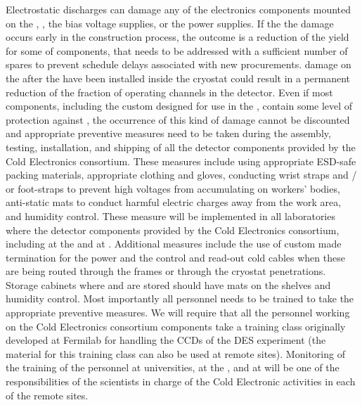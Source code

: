Electrostatic discharges can damage any of the electronics
components mounted on the , ,
the bias voltage supplies, or the power supplies. If the
the damage occurs early in the construction process, 
the outcome is a reduction
of the yield for some of components, that needs to be
addressed with a sufficient number of spares to prevent
schedule delays associated with new procurements. 
damage on the  after the  have been
installed inside the cryostat could result in a permanent
reduction of the fraction of operating channels in the
detector. Even if most components, including the custom 
 designed for use in the , contain 
some level of protection  against , the occurrence 
of this kind of damage cannot be discounted and appropriate 
preventive measures need to be taken during the 
assembly, testing, installation, and shipping of all the detector 
components provided by the Cold Electronics consortium. These 
measures include using appropriate ESD-safe packing materials, 
appropriate clothing and gloves, conducting wrist straps 
and / or foot-straps to prevent high voltages from accumulating 
on workers' bodies, anti-static mats to conduct harmful electric 
charges away from the work area, and humidity control. These
measure will be implemented in all laboratories where the
detector components provided by the Cold Electronics consortium,
including at the  and at \surf. Additional measures
include the use of custom made termination for the
power and the control and read-out cold cables when these
are being routed through the  frames or through the
cryostat penetrations. Storage cabinets where  and
 are stored should have  mats
on the shelves and humidity control. Most importantly all personnel needs 
to be trained to take the appropriate preventive measures. We 
will require that all the personnel working on the Cold Electronics 
consortium components take a training class originally developed 
at Fermilab for handling the CCDs of the DES experiment (the 
material for this training class can also be used at remote 
sites). Monitoring of the training of the personnel at universities, 
at the , and at \surf will be one of the responsibilities 
of the scientists in charge of the Cold Electronic activities in
each of the remote sites.

